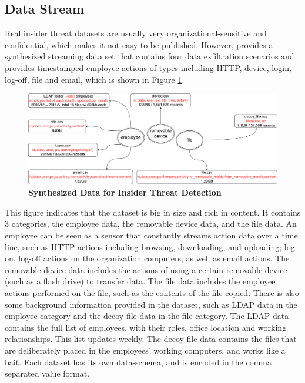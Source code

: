 \subsection{Data Stream}
Real insider threat datasets are usually very organizational-sensitive and confidential, which makes it not easy to be published. 
However, \cite{glasser2013bridging} provides a synthesized streaming data set that contains four data exfiltration scenarios and provides timestamped employee actions of types including HTTP, device, login, log-off, file and email, which is shown in Figure \ref{fig:dxd}.

\begin{figure}[!htbp]
	\centering
    \includegraphics[width=5in]{img/5-dxd.pdf}
    \caption{\textbf{Synthesized Data for Insider Threat Detection}}
    \label{fig:dxd}
\end{figure}

This figure indicates that the dataset is big in size and rich in content. 
It contains 3 categories, the employee data, the removable device data, and the file data. 
An employee can be seen as a sensor that constantly streams action data over a time line, such as HTTP actions including browsing, downloading, and uploading; 
log-on, log-off actions on the organization computers; as well as email actions.
The removable device data includes the actions of using a certain removable device (such as a flash drive) to transfer data.
The file data includes the employee actions performed on the file, such as the contents of the file copied.
There is also some background information provided in the dataset, such as LDAP data in the employee category and the decoy-file data in the file category. 
The LDAP data contains the full list of employees, with their roles, office location and working relationships. 
This list updates weekly. 
The decoy-file data contains the files that are deliberately placed in the employees' working computers, and works like a bait. 
Each dataset has its own data-schema, and is encoded in the comma separated value format.

